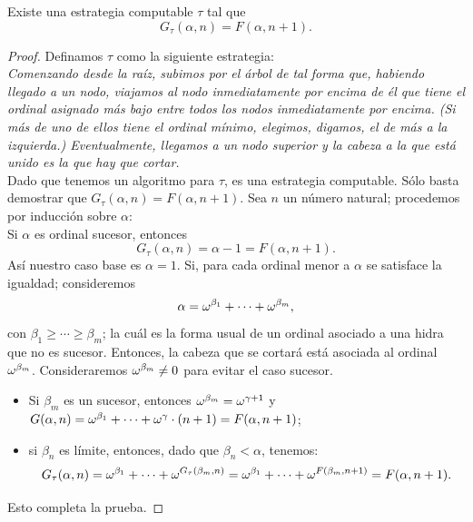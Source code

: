 \begin{prop}
    Existe una estrategia computable $\tau$ tal que 
    \[G_\tau(\alpha,n)=F(\alpha,n+1).\]
\end{prop}
\begin{proof}
    Definamos $\tau$ como la siguiente estrategia:\\
    \textit{Comenzando desde la raíz, subimos por el árbol de tal forma que, habiendo llegado a un nodo, viajamos al nodo inmediatamente por encima de él que tiene el ordinal asignado más bajo entre todos los nodos inmediatamente por encima. (Si más de uno de ellos tiene el ordinal mínimo, elegimos, digamos, el de más a la izquierda.) Eventualmente, llegamos a un nodo superior y la cabeza a la que está unido es la que hay que cortar.}\\
    Dado que tenemos un algoritmo para $\tau$, es una estrategia computable. Sólo basta demostrar que $G_\tau(\alpha,n)=F(\alpha,n+1)$. Sea $n$ un número natural; procedemos por inducción sobre $\alpha$:\\
    Si $\alpha$ es ordinal sucesor, entonces \[G_\tau(\alpha,n)=\alpha-1=F(\alpha,n+1).\]
    Así nuestro caso base es $\alpha=1$.
    Si, para cada ordinal menor a $\alpha$ se satisface la igualdad; consideremos  
    \[\alpha=\omega^{\beta_1}+\cdots+\omega^{\beta_m},\]
    con $\beta_1\geq\cdots\geq\beta_m$; la cuál es la forma usual de un ordinal asociado a una hidra que no es sucesor. Entonces, la cabeza que se cortará está asociada al ordinal $\omega^{\beta_m}$. Consideraremos $\omega^{\beta_m}\neq 0$ para evitar el caso sucesor.
    \begin{itemize}
        \item Si $\beta_m$ es un sucesor, entonces $\omega^{\beta_m}=\omega^{\gamma+1}$ y $G(\alpha,n)=\omega^{\beta_1}+\cdots+\omega^{\gamma}\cdot (n+1)=F(\alpha,n+1)$;
        \item si $\beta_n$ es límite, entonces, dado que $\beta_n<\alpha$, tenemos:
            \[G_\tau(\alpha,n)=\omega^{\beta_1}+\cdots+\omega^{G_\tau(\beta_m,n)}=\omega^{\beta_1}+\cdots+\omega^{F(\beta_m,n+1)}=F(\alpha,n+1).\] 
    \end{itemize}
    Esto completa la prueba.
\end{proof}



